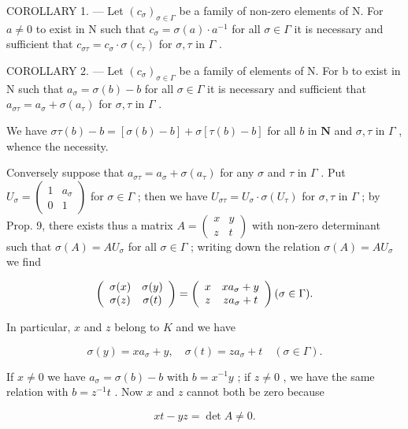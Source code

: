 COROLLARY 1. --- Let \((c_{\sigma})_{\sigma \in \Gamma}\) be a family of non-zero elements of N. For \(a \neq 0\) to exist in N such that \(c_{\sigma} = \sigma(a) \cdot a^{-1}\) for all \(\sigma \in \Gamma\) it is necessary and sufficient that \(c_{\sigma\tau} = c_{\sigma} \cdot \sigma(c_{\tau})\) for \(\sigma, \tau\) in \(\Gamma\) .

COROLLARY 2. --- Let \((c_{\sigma})_{\sigma \in \Gamma}\) be a family of elements of N. For b to exist in N such that \(a_{\sigma} = \sigma(b) - b\) for all \(\sigma \in \Gamma\) it is necessary and sufficient that \(a_{\sigma\tau} = a_{\sigma} + \sigma(a_{\tau})\) for \(\sigma, \tau\) in \(\Gamma\) .

We have \(\sigma \tau(b) - b = [\sigma(b) - b] + \sigma[\tau(b) - b]\) for all \(b\) in \(\mathbf{N}\) and \(\sigma, \tau\) in \(\Gamma\) , whence the necessity.

Conversely suppose that \(a_{\sigma \tau} = a_{\sigma} + \sigma(a_{\tau})\) for any \(\sigma\) and \(\tau\) in \(\Gamma\) . Put \(U_{\sigma} = \begin{pmatrix} 1 & a_{\sigma} \\ 0 & 1 \end{pmatrix}\) for \(\sigma \in \Gamma\) ; then we have \(U_{\sigma \tau} = U_{\sigma} \cdot \sigma(U_{\tau})\) for \(\sigma, \tau\) in \(\Gamma\) ; by Prop. 9, there exists thus a matrix \(A = \begin{pmatrix} x & y \\ z & t \end{pmatrix}\) with non-zero determinant such that \(\sigma(A) = AU_{\sigma}\) for all \(\sigma \in \Gamma\) ; writing down the relation \(\sigma(A) = AU_{\sigma}\) we find

\[
\left( \begin{array}{c c} \sigma (x) & \sigma (y) \\ \sigma (z) & \sigma (t) \end{array} \right) = \left( \begin{array}{c c} x & x a _ {\sigma} + y \\ z & z a _ {\sigma} + t \end{array} \right) (\sigma \in \Gamma).
\]

In particular, \(x\) and \(z\) belong to \(K\) and we have

\[
\sigma (y) = x a _ {\sigma} + y, \quad \sigma (t) = z a _ {\sigma} + t \quad (\sigma \in \Gamma).
\]

If \(x \neq 0\) we have \(a_{\sigma} = \sigma(b) - b\) with \(b = x^{-1}y\) ; if \(z \neq 0\) , we have the same relation with \(b = z^{-1}t\) . Now \(x\) and \(z\) cannot both be zero because

\[
x t - y z = \det A \neq 0.
\]

